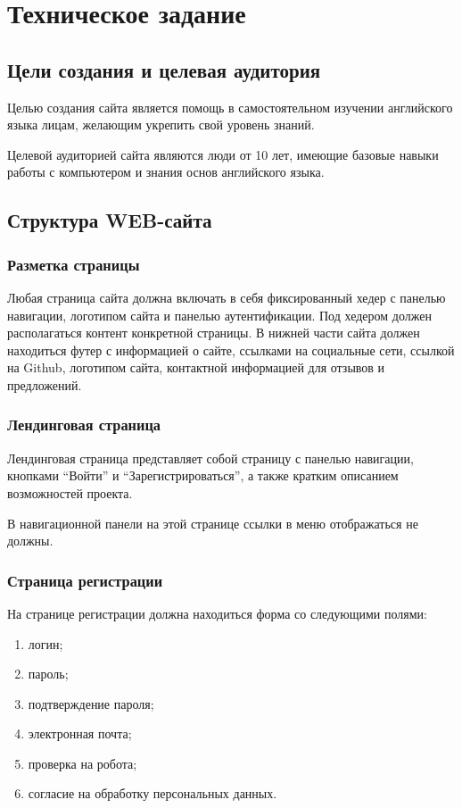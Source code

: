 \documentclass[a4paper,14pt]{extarticle}
\begin{document}
\section{Техническое задание}
\subsection{Цели создания и целевая аудитория}
Целью создания сайта является помощь в самостоятельном изучении английского языка
лицам, желающим укрепить свой уровень знаний.

Целевой аудиторией сайта являются люди от 10 лет, имеющие базовые навыки работы с
компьютером и знания основ английского языка.

\subsection{Структура WEB-сайта}
\subsubsection{Разметка страницы}
Любая страница сайта должна включать в себя фиксированный хедер с панелью навигации, логотипом сайта и панелью аутентификации.
Под хедером должен располагаться контент конкретной страницы. В нижней части сайта должен находиться футер с информацией о сайте,
ссылками на социальные сети, ссылкой на Github, логотипом сайта, контактной информацией для отзывов и предложений.
\subsubsection{Лендинговая страница}
Лендинговая страница представляет собой страницу с панелью навигации, кнопками \enquote{Войти}
и \enquote{Зарегистрироваться}, а также кратким описанием возможностей проекта.

В навигационной панели на этой странице ссылки в меню отображаться не должны.

\subsubsection{Страница регистрации}
На странице регистрации должна находиться форма со следующими полями:
\begin{enumerate}
    \item логин;
    \item пароль;
    \item подтверждение пароля;
    \item электронная почта;
    \item проверка на робота;
    \item согласие на обработку персональных данных.
\end{enumerate}
\end{document}
